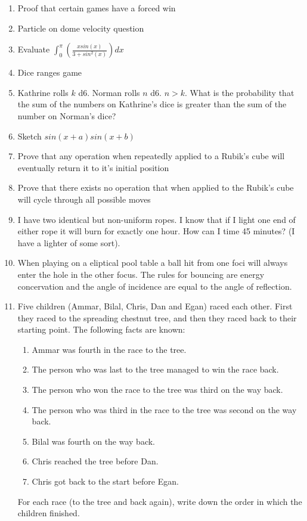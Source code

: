 \documentclass[a4paper]{article}
\begin{document}
\begin{enumerate}
\item
Proof that certain games have a forced win

\item
Particle on dome velocity question

\item
Evaluate
$\int_{0}^{\pi}(\frac{xsin(x)}{3 + sin^2(x)})dx$

\item
Dice ranges game

\item
Kathrine rolls $k$ d6. Norman rolls $n$ d6. $n > k$. What is the probability that the sum of the numbers on Kathrine's dice is greater than the sum of the number on Norman's dice?

\item
Sketch $sin(x+a)sin(x+b)$

\item
Prove that any operation when repeatedly applied to a Rubik's cube will eventually return it to it's initial position

\item
Prove that there exists no operation that when applied to the Rubik's cube will cycle through all possible moves

\item
I have two identical but non-uniform ropes. I know that if I light one end of either rope it will burn for exactly one hour. How can I time 45 minutes? (I have a lighter of some sort).

\item
When playing on a eliptical pool table a ball hit from one foci will always enter the hole in the other focus. The rules for bouncing are energy concervation and the angle of incidence are equal to the angle of reflection.

\item
Five children (Ammar, Bilal, Chris, Dan and Egan) raced each other.  First they raced to the spreading chestnut tree, and then they raced back to their starting point. The following facts are known:
\begin{enumerate}
	\item Ammar was fourth in the race to the tree.
	\item The person who was last to the tree managed to win the race back.
	\item The person who won the race to the tree was third on the way back.
	\item The person who was third in the race to the tree was second on the way back.
	\item Bilal was fourth on the way back.
	\item Chris reached the tree before Dan.
	\item Chris got back to the start before Egan.
\end{enumerate}
For  each  race  (to  the  tree  and  back  again),  write  down  the  order  in  which  the  children finished.


\end{enumerate}
\end{document}
